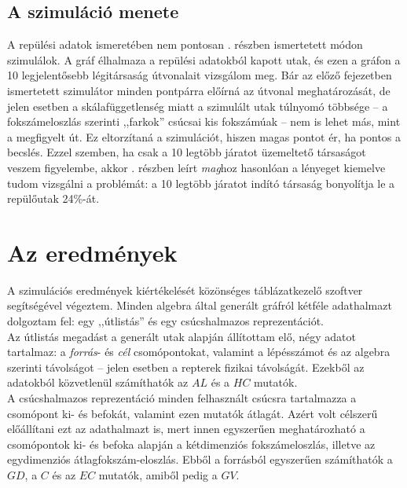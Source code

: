     \subsection{A szimuláció menete}
    A repülési adatok ismeretében nem pontosan . részben ismertetett módon szimulálok. A gráf élhalmaza a repülési adatokból kapott utak, és ezen a gráfon a 10 legjelentősebb légitársaság útvonalait vizsgálom meg. Bár az előző fejezetben ismertetett szimulátor minden pontpárra előírná az útvonal meghatározását, de jelen esetben a skálafüggetlenség miatt a szimulált utak túlnyomó többsége -- a fokszámeloszlás szerinti ,,farkok'' csúcsai kis fokszámúak -- nem is lehet más, mint a megfigyelt út. Ez eltorzítaná a szimulációt, hiszen magas pontot ér, ha pontos a becslés. Ezzel szemben, ha csak a 10 legtöbb járatot üzemeltető társaságot veszem figyelembe, akkor . részben leírt \textit{mag}hoz hasonlóan a lényeget kiemelve tudom vizsgálni a problémát: a 10 legtöbb járatot indító társaság bonyolítja le a repülőutak 24\%-át.

  \section{Az eredmények}
  A szimulációs eredmények kiértékelését közönséges táblázatkezelő szoftver segítségével végeztem. Minden algebra által generált gráfról kétféle adathalmazt dolgoztam fel: egy ,,útlistás'' és egy csúcshalmazos reprezentációt.\\

  Az útlistás megadást a generált utak alapján állítottam elő, négy adatot tartalmaz: a \textit{forrás}- és \textit{cél} csomópontokat, valamint a lépésszámot és az algebra szerinti távolságot -- jelen esetben a repterek fizikai távolságát. Ezekből az adatokból közvetlenül számíthatók az $AL$ és a $HC$ mutatók.\\

  A csúcshalmazos reprezentáció minden felhasznált csúcsra tartalmazza a csomópont ki- és befokát, valamint ezen mutatók átlagát. Azért volt célszerű előállítani ezt az adathalmazt is, mert innen egyszerűen meghatározható a csomópontok ki- és befoka alapján a kétdimenziós fokszámeloszlás, illetve az egydimenziós átlagfokszám-eloszlás. Ebből a forrásból egyszerűen számíthatók a $GD$, a $C$ és az $EC$ mutatók, amiből pedig a $GV$.\\

